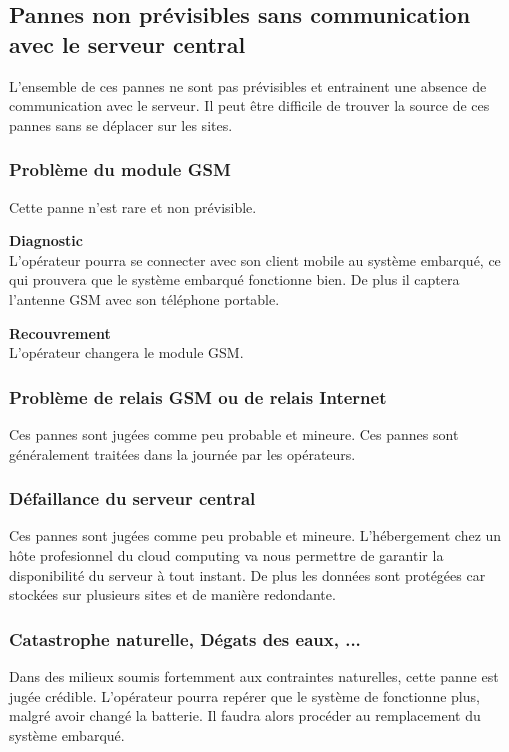 \subsection{Pannes non prévisibles sans communication avec le serveur central}

L'ensemble de ces pannes ne sont pas prévisibles et entrainent une absence de 
communication avec le serveur. Il peut être difficile de trouver la source de ces 
pannes sans se déplacer sur les sites.

\subsubsection{Problème du module GSM}

Cette panne n'est rare et non prévisible. 

\textbf{Diagnostic} \\

L'opérateur pourra se connecter avec son client mobile au système embarqué, 
ce qui prouvera que le système embarqué fonctionne bien.
De plus il captera l'antenne GSM avec son téléphone portable. 

\textbf{Recouvrement} \\

L'opérateur changera le module GSM.

\subsubsection{Problème de relais GSM ou de relais Internet}

Ces pannes sont jugées comme peu probable et mineure. Ces pannes sont généralement 
traitées dans la journée par les opérateurs.

\subsubsection{Défaillance du serveur central}

Ces pannes sont jugées comme peu probable et mineure. 
L'hébergement chez un hôte profesionnel du cloud computing va nous permettre de 
garantir la disponibilité du serveur à tout instant. De plus les données sont 
protégées car stockées sur plusieurs sites et de manière redondante.

\subsubsection{Catastrophe naturelle, Dégats des eaux,  ...}

Dans des milieux soumis fortemment aux contraintes naturelles, cette panne est jugée crédible.
L'opérateur pourra repérer que le système de fonctionne plus, malgré avoir changé la batterie. 
Il faudra alors procéder au remplacement du système embarqué.



